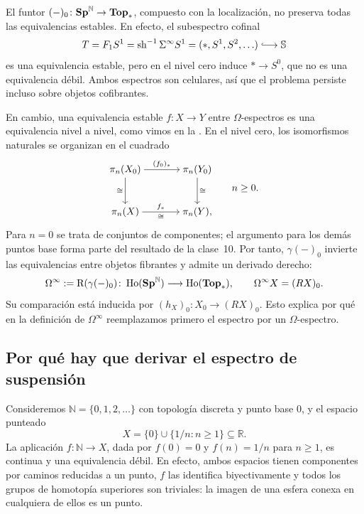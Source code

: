 El funtor $(-)_0\colon\mathbf{Sp}^{\mathbb N}\to\mathbf{Top}_*$, compuesto con la localización, no preserva todas las equivalencias estables. En efecto, el subespectro cofinal
\[
T=F_1S^1=\sh^{-1}\Sigma^\infty S^1=(*,S^1,S^2,\ldots)
\lhook\joinrel\longrightarrow\Sph
\]
es una equivalencia estable, pero en el nivel cero induce $*\to S^0$, que no es una equivalencia débil. Ambos espectros son celulares, así que el problema persiste incluso sobre objetos cofibrantes.

En cambio, una equivalencia estable $f\colon X\to Y$ entre $\Omega$-espectros es una equivalencia nivel a nivel, como vimos en la . En el nivel cero, los isomorfismos naturales se organizan en el cuadrado
\[
\begin{tikzcd}[cramped,column sep=large,row sep=large]
\pi_n(X_0) \arrow[r,"(f_0)_*"] \arrow[d,"\cong"']
& \pi_n(Y_0) \arrow[d,"\cong"]\\
\pi_n(X) \arrow[r,"f_*","\cong"'] & \pi_n(Y),
\end{tikzcd}
\qquad n\ge0.
\]
Para $n=0$ se trata de conjuntos de componentes; el argumento para los demás puntos base forma parte del resultado de la clase~10. Por tanto, $\gamma(-)_0$ invierte las equivalencias entre objetos fibrantes y admite un derivado derecho:
\[
\Omega^\infty:=\mathrm R(\gamma(-)_0)\colon
\operatorname{Ho}(\mathbf{Sp}^{\mathbb N})\longrightarrow\operatorname{Ho}(\mathbf{Top}_*),\qquad
\Omega^\infty X=(RX)_0.
\]
Su comparación está inducida por $(h_X)_0\colon X_0\to(RX)_0$. Esto explica por qué en la definición de $\Omega^\infty$ reemplazamos primero el espectro por un $\Omega$-espectro.

\subsection{Por qué hay que derivar el espectro de suspensión}

Consideremos $\mathbb N=\{0,1,2,\ldots\}$ con topología discreta y punto base $0$, y el espacio punteado
\[
X=\{0\}\cup\{1/n:n\ge1\}\subseteq\mathbb R.
\]
La aplicación $f\colon\mathbb N\to X$, dada por $f(0)=0$ y $f(n)=1/n$ para $n\ge1$, es continua y una equivalencia débil. En efecto, ambos espacios tienen componentes por caminos reducidas a un punto, $f$ las identifica biyectivamente y todos los grupos de homotopía superiores son triviales: la imagen de una esfera conexa en cualquiera de ellos es un punto.

